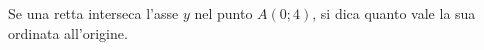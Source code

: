 Se una retta interseca l'asse \(\displaystyle y\) nel punto \(\displaystyle A(0;4)\), si dica quanto vale 
la sua ordinata all'origine.